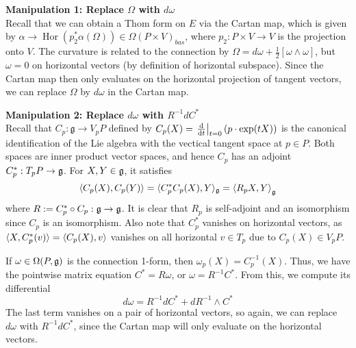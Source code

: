 \vspace{1ex}\noindent
\textbf{Manipulation 1: Replace $\Omega$ with  $d\omega$} \\
Recall that we can obtain a Thom form on $E$ via the Cartan map, which is given
by $\alpha\to \operatorname{Hor}(p_2^*\alpha(\Omega)) \in \Omega(P\times V)_{bas}$, 
where $p_2:P\times V\to V$ is the projection onto $V$.  
The curvature is related to the connection by 
$\Omega = d\omega + \frac{1}{2}[\omega\wedge \omega]$, but $\omega=0$ on
horizontal vectors (by definition of horizontal subspace). Since the Cartan map
then only evaluates on the horizontal projection of tangent vectors, we can 
replace  $\Omega$ by  $d\omega$ in the Cartan map. 

\vspace{1ex}\noindent
\textbf{Manipulation 2: Replace $d\omega$ with  $R^{-1}dC^*$} \\
Recall that $C_p : \mathfrak{g} \to V_pP$ defined by  $C_p(X) = \odv{}{t}_{t=0}
(p\cdot \exp(tX))$ is the canonical identification of the Lie algebra with the
vectical tangent space at $p\in P$. Both spaces are inner product vector spaces,
and hence $C_p$ has an adjoint  $C_p^* : T_pP \to \operatorname{\mathfrak{g}}$. For $X,Y\in \operatorname{\mathfrak{g}}$, it
satisfies 
\[
	\gen{C_p(X), C_p(Y)} = \gen[*]{C_p^*C_p(X),Y}_{\g} = \gen{R_p X, Y}_{\g}
\] 
where $R := C_p^*\circ C_p : \operatorname{\mathfrak{g}} \to \operatorname{\mathfrak{g}}$. It is clear that $R_p$ is self-adjoint
and an isomorphism since $C_p$ is an isomorphism. 
Also note that $C_p^*$ vanishes on horizontal vectors, as 
$\gen[*]{X,C_p^*(v)} = \gen{C_p(X),v}$ vanishes on
all horizontal $v\in T_p$ due to $C_p(X)\in V_pP$. 

If $\omega\in \Omega(P,\operatorname{\mathfrak{g}})$ is 
the connection 1-form, then $\omega_p(X) = C_p^{-1}(X)$. Thus, we have the
pointwise matrix equation $C^* = R\omega$, or $\omega = R^{-1}C^*$. From this,
we compute its differential 
\[
d\omega = R^{-1} dC^* + dR^{-1} \wedge C^*
\] 
The last term vanishes on a pair of horizontal vectors, so again, we can replace
$d\omega$ with $R^{-1}dC^*$, since the Cartan map will only evaluate on the
horizontal vectors.


